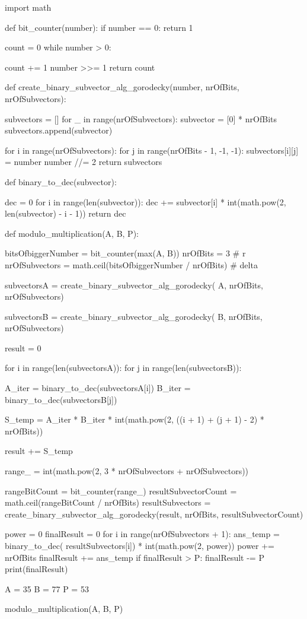 \documentclass[11pt]{article}
\renewcommand\*{\cdot}
\begin{document}
\begin{python}

    import math


    def bit_counter(number):
    if number == 0:
    return 1

    count = 0
    while number > 0:

    count += 1
    number >>= 1
    return count


    def create_binary_subvector_alg_gorodecky(number, nrOfBits, nrOfSubvectors):

    subvectors = []
    for _ in range(nrOfSubvectors):
    subvector = [0] * nrOfBits
    subvectors.append(subvector)

    for i in range(nrOfSubvectors):
    for j in range(nrOfBits - 1, -1, -1):
    subvectors[i][j] = number %
    number //= 2
    return subvectors


    def binary_to_dec(subvector):

    dec = 0
    for i in range(len(subvector)):
    dec += subvector[i] * int(math.pow(2, len(subvector) - i - 1))
    return dec


    def modulo_multiplication(A, B, P):

    bitsOfbiggerNumber = bit_counter(max(A, B))
    nrOfBits = 3  # r
    nrOfSubvectors = math.ceil(bitsOfbiggerNumber / nrOfBits)  # delta

    subvectorsA = create_binary_subvector_alg_gorodecky(
    A, nrOfBits, nrOfSubvectors)

    subvectorsB = create_binary_subvector_alg_gorodecky(
    B, nrOfBits, nrOfSubvectors)

    result = 0

    for i in range(len(subvectorsA)):
    for j in range(len(subvectorsB)):

    A_iter = binary_to_dec(subvectorsA[i])
    B_iter = binary_to_dec(subvectorsB[j])

    S_temp = A_iter * B_iter * int(math.pow(2,
    ((i + 1) + (j + 1) - 2) * nrOfBits)) %

    result += S_temp

    range_ = int(math.pow(2, 3 * nrOfSubvectors + nrOfSubvectors))

    rangeBitCount = bit_counter(range_)
    resultSubvectorCount = math.ceil(rangeBitCount / nrOfBits)
    resultSubvectors = create_binary_subvector_alg_gorodecky(result, nrOfBits,
    resultSubvectorCount)

    power = 0
    finalResult = 0
    for i in range(nrOfSubvectors + 1):
    ans_temp = binary_to_dec(
    resultSubvectors[i]) * int(math.pow(2, power)) %
    power += nrOfBits
    finalResult += ans_temp
    if finalResult > P:
    finalResult -= P
    print(finalResult)


    A = 35
    B = 77
    P = 53

    modulo_multiplication(A, B, P)



\end{python}
\end{document}

